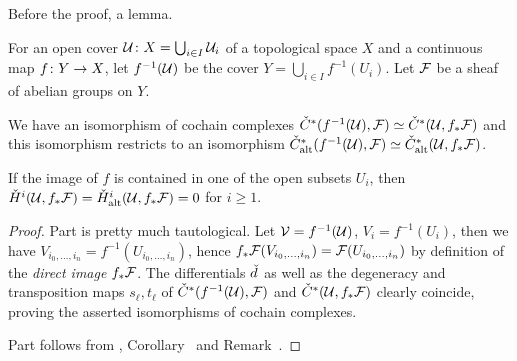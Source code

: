 \documentclass[a4paper,parskip=half,numbers=enddot, DIV=12]{scrreprt}
\begin{document}
Before the proof, a lemma.
\begin{lem}
	For an open cover $\mathcal{U}\colon X=\bigcup_{i\in I}\mathcal{U}_i$ of a topological space $X$ and a continuous map $f\colon Y\morphism X$, let $f^{-1}(\mathcal{U})$ be the cover $Y=\bigcup_{i\in I}f^{-1}(U_i)$. Let $\mathcal{F}$ be a sheaf of abelian groups on $Y$.
	\begin{alphanumerate}
		\item We have an isomorphism of cochain complexes $\check{C}^*(f^{-1}(\mathcal{U}),\mathcal{F})\simeq \check{C}^*(\mathcal{U},f_*\mathcal{F})$ and this isomorphism restricts to an isomorphism $\check{C}_{\mathrm{alt}}^*(f^{-1}(\mathcal{U}),\mathcal{F})\simeq \check{C}_{\mathrm{alt}}^*(\mathcal{U},f_*\mathcal{F})$.
		\item If the image of $f$ is contained in one of the open subsets $U_i$, then $\check{H}^i(\mathcal{U},f_*\mathcal{F})=\check{H}_{\mathrm{alt}}^i(\mathcal{U},f_*\mathcal{F})=0$ for $i\geq 1$.
	\end{alphanumerate}
\end{lem}
\begin{proof}
	Part  is pretty much tautological. Let $\mathcal{V}=f^{-1}(\mathcal{U})$, $V_i=f^{-1}(U_i)$, then we have $V_{i_0,\ldots,i_n}=f^{-1}(U_{i_0,\ldots,i_n})$, hence $f_*\mathcal{F}(V_{i_0,\ldots,i_n})=\mathcal{F}(U_{i_0,\ldots,i_n})$ by definition of the \emph{direct image} $f_*\mathcal{F}$. The differentials $\check{d}\hspace{0.06125em}$ as well as the degeneracy and transposition maps $s_\ell,t_\ell$ of $\check{C}^*(f^{-1}(\mathcal{U}),\mathcal{F})$ and $\check{C}^*(\mathcal{U},f_*\mathcal{F})$ clearly coincide, proving the asserted isomorphisms of cochain complexes.
	
	Part  follows from , Corollary~ and Remark~.
\end{proof}
\end{document}
